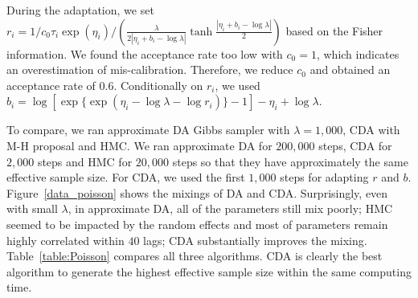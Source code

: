 \documentclass[10pt]{article}
\begin{document}
During the adaptation, we set $r_i = 1/c_0 \tau_i\exp(\eta_i) /  \left( \frac{\lambda } {2|\eta_i + b_i - \log\lambda|}  \tanh\frac{ |\eta_i + b_i - \log\lambda|}{2} \right )$ based on the Fisher information. We found the acceptance rate too low with $c_0 =1$, which indicates an overestimation of mis-calibration. Therefore, we reduce $c_0$ and obtained an acceptance rate of $0.6$. Conditionally on $r_i$, we used $b_i=\log[ \exp \{ \exp(\eta_i - \log\lambda -\log r_i)   \}-1] -\eta_i + \log\lambda$.


To compare, we ran approximate DA Gibbs sampler with $\lambda=1,000$, CDA with M-H proposal and HMC. We ran approximate DA for $200,000$ steps, CDA for $2,000$ steps and HMC for $20,000$ steps so that they have approximately the same effective sample size. For CDA, we used the first $1,000$ steps for adapting $r$ and $b$. Figure~\ref{data_poisson} shows the mixings of DA and CDA. Surprisingly, even with small $\lambda$, in approximate DA, all of the parameters still mix poorly; HMC seemed to be impacted by the random effects and most of parameters remain highly correlated within $40$ lags; CDA substantially improves the mixing. Table~\ref{table:Poisson} compares all three algorithms. CDA is clearly the best algorithm to generate the highest effective sample size within the same computing time.
\end{document}
